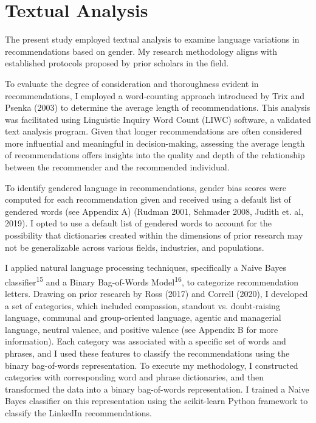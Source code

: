 \documentclass[12pt]{caltech_thesis}
\begin{document}
\section{Textual Analysis}
The present study employed textual analysis to examine language variations in recommendations based on gender. My research methodology aligns with established protocols proposed by prior scholars in the field.

To evaluate the degree of consideration and thoroughness evident in recommendations, I employed a word-counting approach introduced by Trix and Psenka (2003) to determine the average length of recommendations. This analysis was facilitated using Linguistic Inquiry Word Count (LIWC) software, a validated text analysis program. Given that longer recommendations are often considered more influential and meaningful in decision-making, assessing the average length of recommendations offers insights into the quality and depth of the relationship between the recommender and the recommended individual.

To identify gendered language in recommendations, gender bias scores were computed for each recommendation given and received using a default list of gendered words (see Appendix A)  (Rudman 2001, Schmader 2008, Judith et. al, 2019). I opted to use a default list of gendered words to account for the possibility that dictionaries created within the dimensions of prior research may not be generalizable across various fields, industries, and populations.

I applied natural language processing techniques, specifically a Naive Bayes classifier\textsuperscript{15} and a Binary Bag-of-Words Model\textsuperscript{16}, to categorize recommendation letters. Drawing on prior research by Ross (2017) and Correll (2020), I developed a set of categories, which included compassion, standout vs. doubt-raising language, communal and group-oriented language, agentic and managerial language, neutral valence, and positive valence (see Appendix B for more information). Each category was associated with a specific set of words and phrases, and I used these features to classify the recommendations using the binary bag-of-words representation. To execute my methodology, I constructed categories with corresponding word and phrase dictionaries, and then transformed the data into a binary bag-of-words representation. I trained a Naive Bayes classifier on this representation using the scikit-learn Python framework to classify the LinkedIn recommendations.
\end{document}

